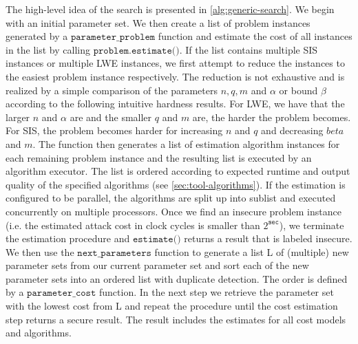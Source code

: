 The high-level idea of the search is presented in \cref{alg:generic-search}. We begin with an initial parameter set. We then create a list of problem instances generated by a $\texttt{parameter\_problem}$ function and estimate the cost of all instances in the list by calling $\texttt{problem.estimate()}$. If the list contains multiple SIS instances or multiple LWE instances, we first attempt to reduce the instances to the easiest problem instance respectively. The reduction is not exhaustive and is realized by a simple comparison of the parameters $n, q, m$ and $\alpha$ or bound $\beta$ according to the following intuitive hardness results. For LWE, we have that the larger $n$ and $\alpha$ are and the smaller $q$ and $m$ are, the harder the problem becomes. For SIS, the problem becomes harder for increasing $n$ and $q$ and decreasing $beta$ and $m$. The function then generates a list of estimation algorithm instances for each remaining problem instance and the resulting list is executed by an algorithm executor. The list is ordered according to expected runtime and output quality of the specified algorithms (see \cref{sec:tool-algorithms}). If the estimation is configured to be parallel, the algorithms are split up into sublist and executed concurrently on multiple processors.
Once we find an insecure problem instance (i.e. the estimated attack cost in clock cycles is smaller than $2^{\texttt{sec}}$), we terminate the estimation procedure and $\texttt{estimate()}$ returns a result that is labeled insecure. We then use the $\texttt{next\_parameters}$ function to generate a list L of (multiple) new parameter sets from our current parameter set and sort each of the new parameter sets into an ordered list with duplicate detection. The order is defined by a $\texttt{parameter\_cost}$ function. In the next step we retrieve the parameter set with the lowest cost from L and repeat the procedure until the cost estimation step returns a secure result. The result includes the estimates for all cost models and algorithms.

